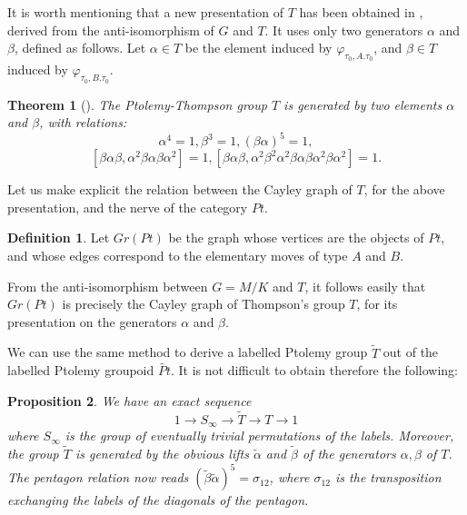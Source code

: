 \documentclass[twoside]{irmaems}
\theoremstyle{plain}
\newtheorem{theorem}{Theorem}[section]
\newtheorem{proposition}[theorem]{Proposition}
\theoremstyle{definition}
\newtheorem{definition}{Definition}[section]
\theoremstyle{remark}
\begin{document}
 
\vspace{0.1cm}\noindent 
It is worth mentioning that a new presentation of $T$ has been obtained in \cite{lo-sc}, derived from the anti-isomorphism of $G$ and $T$.
It uses only two generators $\alpha$ and $\beta$, defined as follows. Let $\alpha\in T$ 
be the element induced by  $\varphi_{\tau_0, A.\tau_0}$, and 
 $\beta\in T$ induced by $\varphi_{\tau_0, B.\tau_0}$. 

\begin{theorem}[\cite{lo-sc}]
The Ptolemy-Thompson group 
$T$ is generated by two elements $\alpha$ and $\beta$, with relations:
$${\alpha}^4=1, {\beta}^3=1, (\beta\alpha)^5=1,$$        
$$[\beta\alpha\beta,\alpha^2\beta\alpha\beta\alpha^2]=1, [\beta\alpha\beta,\alpha^2\beta^2\alpha^2\beta\alpha\beta\alpha^2\beta\alpha^2]=1.$$ 

\end{theorem}


\vspace{0.1cm}\noindent 
Let us make explicit the relation between the Cayley graph of $T$, for the above presentation, and the nerve of the category $Pt$. 


\begin{definition}
Let $Gr(Pt)$ be the graph whose vertices are the objects of $Pt$, and 
whose edges correspond to the elementary moves of type $A$ and $B$.
\end{definition}

\vspace{0.1cm}\noindent 
From the anti-isomorphism between $G=M/K$ and $T$, it follows easily that $Gr(Pt)$ is 
precisely the Cayley graph of Thompson's group $T$, for its presentation on the generators $\alpha$ and $\beta$.


\vspace{0.1cm}\noindent 
We can use the same method to derive a labelled Ptolemy group $\widetilde{T}$ out of the labelled Ptolemy groupoid $\widetilde{Pt}$.  It is not 
difficult to obtain therefore the following: 

\begin{proposition}\label{permut}
We have an exact sequence 
\[ 1\to S_{\infty} \to \widetilde{T}\to T\to 1\]
where $S_{\infty}$ is the group of  eventually trivial 
permutations of the labels. Moreover, the group $\widetilde{T}$ is 
generated by the obvious lifts $\widetilde{\alpha}$ and $\widetilde{\beta}$ 
of the generators $\alpha,\beta$ of $T$. The pentagon relation now reads 
$(\widetilde{\beta}\widetilde{\alpha})^5=\sigma_{12}$, where 
$\sigma_{12}$ is the transposition exchanging the labels of the diagonals 
of the pentagon.
\end{proposition}  
 
\end{document}

